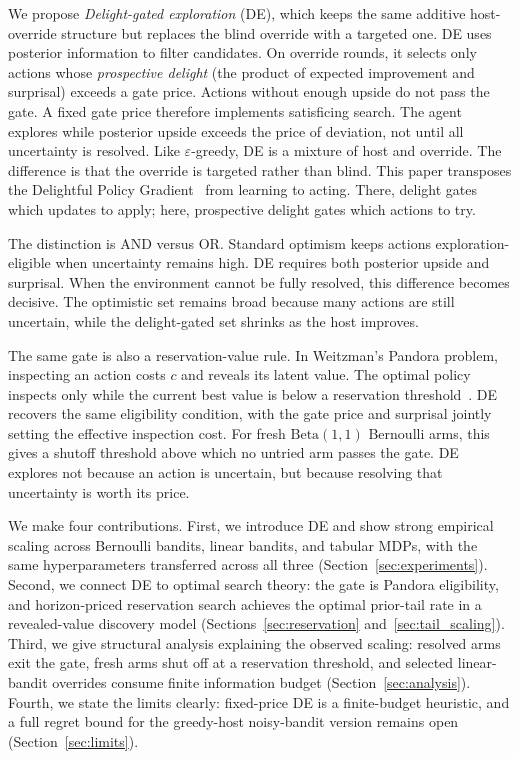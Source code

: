 \documentclass{article}
\begin{document}
We propose \emph{Delight-gated exploration} (DE), which keeps the same additive host-override structure but replaces the blind override with a targeted one.
DE uses posterior information to filter candidates.
On override rounds, it selects only actions whose \emph{prospective delight} (the product of expected improvement and surprisal) exceeds a gate price.
Actions without enough upside do not pass the gate.
A fixed gate price therefore implements satisficing search.
The agent explores while posterior upside exceeds the price of deviation, not until all uncertainty is resolved.
Like $\varepsilon$-greedy, DE is a mixture of host and override.
The difference is that the override is targeted rather than blind.
This paper transposes the Delightful Policy Gradient~\citep{osband2026delightfulpolicygradient} from learning to acting.
There, delight gates which updates to apply; here, prospective delight gates which actions to try.

The distinction is AND versus OR.
Standard optimism keeps actions exploration-eligible when uncertainty remains high.
DE requires both posterior upside and surprisal.
When the environment cannot be fully resolved, this difference becomes decisive.
The optimistic set remains broad because many actions are still uncertain, while the delight-gated set shrinks as the host improves.

The same gate is also a reservation-value rule.
In Weitzman's Pandora problem, inspecting an action costs $c$ and reveals its latent value.
The optimal policy inspects only while the current best value is below a reservation threshold~\citep{weitzman1979optimal}.
DE recovers the same eligibility condition, with the gate price and surprisal jointly setting the effective inspection cost.
For fresh $\mathrm{Beta}(1,1)$ Bernoulli arms, this gives a shutoff threshold above which no untried arm passes the gate.
DE explores not because an action is uncertain, but because resolving that uncertainty is worth its price.

We make four contributions.
First, we introduce DE and show strong empirical scaling across Bernoulli bandits, linear bandits, and tabular MDPs, with the same hyperparameters transferred across all three (Section~\ref{sec:experiments}).
Second, we connect DE to optimal search theory: the gate is Pandora eligibility, and horizon-priced reservation search achieves the optimal prior-tail rate in a revealed-value discovery model (Sections~\ref{sec:reservation} and~\ref{sec:tail_scaling}).
Third, we give structural analysis explaining the observed scaling: resolved arms exit the gate, fresh arms shut off at a reservation threshold, and selected linear-bandit overrides consume finite information budget (Section~\ref{sec:analysis}).
Fourth, we state the limits clearly: fixed-price DE is a finite-budget heuristic, and a full regret bound for the greedy-host noisy-bandit version remains open (Section~\ref{sec:limits}).
\end{document}
